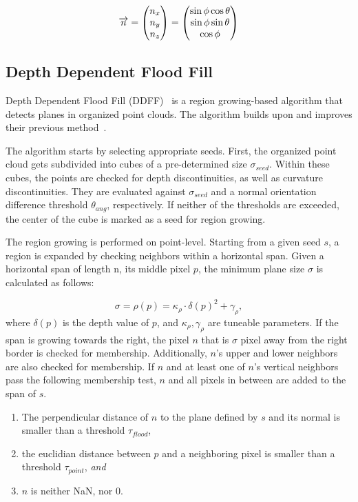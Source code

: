 \documentclass[main.tex]{subfiles}
\begin{document}
\begin{equation}
    \overrightarrow{n}  = \begin{pmatrix} n_x \\ n_y \\ n_z \end{pmatrix} = \begin{pmatrix} \sin\phi\cos\theta \\ \sin\phi\sin\theta \\ \cos\phi \end{pmatrix}
\end{equation}


\subsection{Depth Dependent Flood Fill}
\label{subsec:bg-ddff}
Depth Dependent Flood Fill (DDFF)~\cite{Roychoudhury_Missura_Bennewitz_2021_new} is a region growing-based algorithm that detects planes in organized point clouds.
The algorithm builds upon and improves their previous method~\cite{Roychoudhury_Missura_Bennewitz_2021_old}.

The algorithm starts by selecting appropriate seeds. First, the organized point cloud gets subdivided into cubes of a
pre-determined size $\sigma_{seed}$. Within these cubes, the points are checked for depth discontinuities, as well as
curvature discontinuities. They are evaluated against $\sigma_{seed}$ and a normal orientation difference
threshold $\theta_{ang}$, respectively. If neither of the thresholds are exceeded, the center of the cube is marked as
a seed for region growing.

The region growing is performed on point-level. Starting from a given seed $s$, a region is expanded by checking
neighbors within a horizontal span.
Given a horizontal span of length n, its middle pixel $p$, the minimum plane size $\sigma$ is calculated as follows:

\begin{equation}
    \sigma = \rho(p) = \kappa_\rho \cdot \delta(p)^2 + \gamma_\rho,
\end{equation}
where $\delta(p)$ is the depth value of $p$, and $\kappa_\rho, \gamma_\rho$ are tuneable parameters.
If the span is growing towards the right, the pixel $n$ that is $\sigma$ pixel away from the right border is checked
for membership. Additionally, $n$'s upper and lower neighbors are also checked for membership. If $n$ and at least one
of $n$'s vertical neighbors pass the following membership test, $n$ and all pixels in between are added to the span of $s$.

\begin{enumerate}
    \item The perpendicular distance of $n$ to the plane defined by $s$ and its normal is smaller than
          a threshold $\tau_{flood}$,
    \item the euclidian distance between $p$ and a neighboring pixel is smaller than a threshold
          $\tau_{point}$, \textit{and}
    \item $n$ is neither NaN, nor 0.
\end{enumerate}
\end{document}
